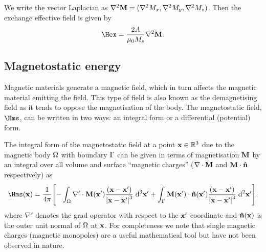 We write the vector Laplacian as $\nabla^2 \boldsymbol{\mathrm{M}} = (\nabla^2 M_x,\nabla^2 M_y, \nabla^2 M_z )$.
Then the exchange effective field is given by
\begin{equation}
  \label{eq:Hex}
  \Hex = \frac{2 \Exchc}{ \mu_0 M_s} \lap \Mv.
\end{equation}


\subsection{Magnetostatic energy}
\label{sec:magnetostatic-field}

Magnetic materials generate a magnetic field, which in turn affects the magnetic material emitting the field.
This type of field is also known as the demagnetising field as it tends to oppose the magnetisation of the body.
The magnetostatic field, $\Hms$, can be written in two ways: an integral form or a differential (potential) form.

The integral form of the magnetostatic field at a point $\boldsymbol{\mathrm{x}} \in \mathbb{R}^3$ due to the magnetic body $\Omega$ with boundary ${\Gamma}$ can be given in terms of magnetisation $\boldsymbol{\mathrm{M}}$ by an integral over all volume and surface ``magnetic charges'' ($\nabla \cdot \boldsymbol{\mathrm{M}}$ and $\boldsymbol{\mathrm{M}} \cdot \boldsymbol{\mathrm{\hat{n}}}$ respectively) as
\begin{equation}
  \Hms(\xv) = \frac{1}{4 \pi} \bigs{
    - \int_\magd \nabla' \cdot \Mv(\xv') \frac{(\xv - \xv')}{\abs{\xv -\xv'}^3} \d^3 \xv'
    + \int_\boundd \Mv(\xv') \cdot \nv(\xv') \frac{(\xv - \xv')}{\abs{\xv - \xv'}^3} \d^2 \xv' },
  \label{eq:Hmsint}
\end{equation}
where $\nabla'$ denotes the grad operator with respect to the $\boldsymbol{\mathrm{x}}'$ coordinate and $\boldsymbol{\mathrm{\hat{n}}}(\boldsymbol{\mathrm{x}})$ is the outer unit normal of $\Omega$ at $\boldsymbol{\mathrm{x}}$.
For completeness we note that single magnetic charges (magnetic monopoles) are a useful mathematical tool but have not been observed in nature.




